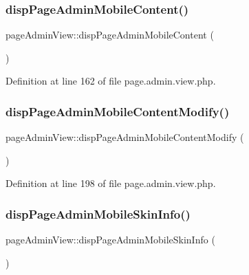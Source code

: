 \subsubsection{\texorpdfstring{disp\+Page\+Admin\+Mobile\+Content()}{dispPageAdminMobileContent()}}
{\footnotesize\ttfamily page\+Admin\+View\+::disp\+Page\+Admin\+Mobile\+Content (\begin{DoxyParamCaption}{ }\end{DoxyParamCaption})}



Definition at line 162 of file page.\+admin.\+view.\+php.

\mbox{\label{classpageAdminView_a71e87e225509a1c4e761ecc57852c5f5}} 
\subsubsection{\texorpdfstring{disp\+Page\+Admin\+Mobile\+Content\+Modify()}{dispPageAdminMobileContentModify()}}
{\footnotesize\ttfamily page\+Admin\+View\+::disp\+Page\+Admin\+Mobile\+Content\+Modify (\begin{DoxyParamCaption}{ }\end{DoxyParamCaption})}



Definition at line 198 of file page.\+admin.\+view.\+php.

\mbox{\label{classpageAdminView_a04fa424a6f0dabc81b6a4ab4c32a53b8}} 
\subsubsection{\texorpdfstring{disp\+Page\+Admin\+Mobile\+Skin\+Info()}{dispPageAdminMobileSkinInfo()}}
{\footnotesize\ttfamily page\+Admin\+View\+::disp\+Page\+Admin\+Mobile\+Skin\+Info (\begin{DoxyParamCaption}{ }\end{DoxyParamCaption})}

